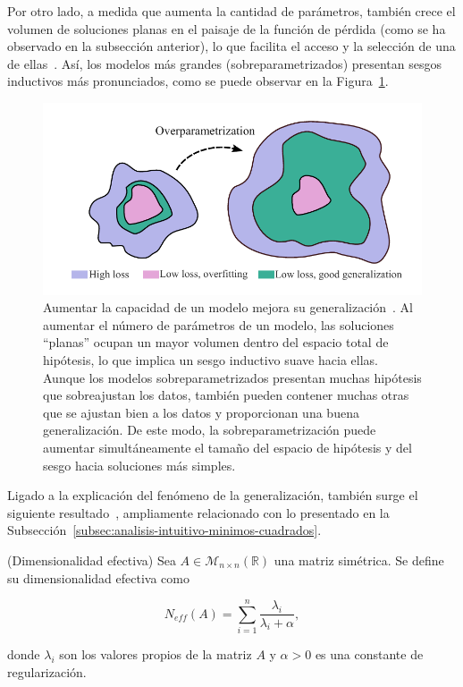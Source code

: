 Por otro lado, a medida que aumenta la cantidad de parámetros, también crece el volumen de soluciones planas en el paisaje de la función de pérdida (como se ha observado en la subsección anterior), lo que facilita el acceso y la selección de una de ellas~\cite{Huang2020}. Así, los modelos más grandes (sobreparametrizados) presentan sesgos inductivos más pronunciados, como se puede observar en la Figura~\ref{fig:overparametrization}.

\begin{figure}[h]
    \centering
    \includegraphics[width=0.5\linewidth]{img/overparametrization.png}
    \caption[Aumentar la capacidad de un modelo mejora su generalización~\cite{Wilson2025}.]{Aumentar la capacidad de un modelo mejora su generalización~\cite{Wilson2025}. Al aumentar el número de parámetros de un modelo, las soluciones ``planas'' ocupan un mayor volumen dentro del espacio total de hipótesis, lo que implica un sesgo inductivo suave hacia ellas. Aunque los modelos sobreparametrizados presentan muchas hipótesis que sobreajustan los datos, también pueden contener muchas otras que se ajustan bien a los datos y proporcionan una buena generalización. De este modo, la sobreparametrización puede aumentar simultáneamente el tamaño del espacio de hipótesis y del sesgo hacia soluciones más simples.}\label{fig:overparametrization}
\end{figure}

Ligado a la explicación del fenómeno de la generalización, también surge el siguiente resultado~\cite{Maddox2020}, ampliamente relacionado con lo presentado en la Subsección~\ref{subsec:analisis-intuitivo-minimos-cuadrados}.

\begin{definicion}(Dimensionalidad efectiva)
    Sea $A \in \mathcal{M}_{n \times n}(\mathbb{R})$ una matriz simétrica. Se define su dimensionalidad efectiva como

    \[
        N_{eff}(A) = \sum_{i=1}^{n}\frac{\lambda_i}{\lambda_i + \alpha},
    \]

    donde $\lambda_i$ son los valores propios de la matriz $A$ y $\alpha > 0$ es una constante de regularización.
\end{definicion}

